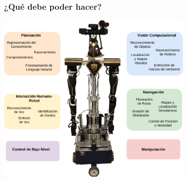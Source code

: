 \documentclass[10pt,spanish,aspectratio=1610]{beamer}
\begin{document}
\begin{frame}\frametitle{¿Qué debe poder hacer?}
  \centering
  \includegraphics[width=0.73\textwidth]{Figures/Subsystems.pdf}
\end{frame}
\end{document}

